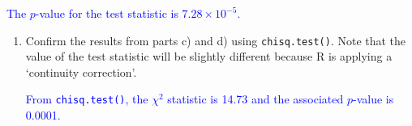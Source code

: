 \documentclass[letterpaper,12pt,twoside,]{pinp}
\begin{document}
\begin{enumerate}
\begin{enumerate}
    \textcolor{blue}{The $p$-value for the test statistic is $7.28 \times 10^{-5}$.}
  \end{enumerate}

\begin{Shaded}
\begin{Highlighting}[]
\NormalTok{ (} \OperatorTok{-}\StringTok{ }\NormalTok{)}\OperatorTok{*}\NormalTok{(} \OperatorTok{-}\StringTok{ }\NormalTok{), } \NormalTok{)}
\end{Highlighting}
\end{Shaded}

  \begin{enumerate}
  \def\labelenumii{\alph{enumii})}
  \setcounter{enumii}{5}
  \item
    Confirm the results from parts c) and d) using
    \texttt{chisq.test()}. Note that the value of the test statistic
    will be slightly different because \textsf{R} is applying a
    `continuity correction'.

    \textcolor{blue}{From \texttt{chisq.test()}, the $\chi^2$ statistic is 14.73 and the associated $p$-value is 0.0001.}
  \end{enumerate}

\begin{Shaded}
\begin{Highlighting}[]
\StringTok{ }\NormalTok{(}\NormalTok{(}\NormalTok{, }\NormalTok{, }\NormalTok{, }\NormalTok{), }
               \NormalTok{, } \NormalTok{, }

\StringTok{ }\NormalTok{(}\NormalTok{ =}\StringTok{ }\NormalTok{(}\NormalTok{, }\NormalTok{),}
                        \NormalTok{ =}\StringTok{ }\NormalTok{(}\NormalTok{, }\NormalTok{))}
\end{Highlighting}
\end{Shaded}


\end{enumerate}
\end{document}
